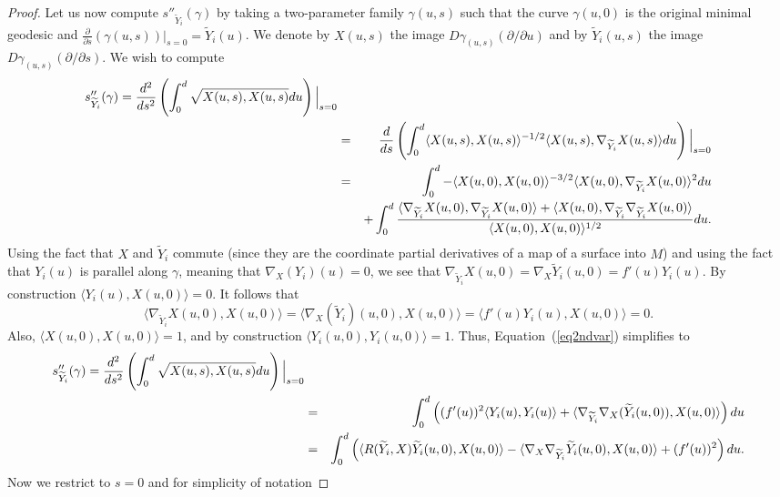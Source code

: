 \begin{proof}
Let us now compute $s''_{\widetilde Y_i}(\gamma)$ by taking a
two-parameter family $\gamma(u,s)$ such that the curve $\gamma(u,0)$
is the original minimal geodesic and $\frac{\partial}{\partial
s}(\gamma(u,s))|_{s=0}=\widetilde Y_i(u)$.  We denote by $X(u,s)$
the image $D\gamma_{(u,s)}(\partial/\partial u)$ and by $\widetilde
Y_i(u,s)$ the image $D\gamma_{(u,s)}(\partial/\partial s)$. We wish
to compute
\begin{eqnarray}
s''_{\widetilde Y_i}(\gamma) =
\frac{d^2}{ds^2}\left(\int_0^d\sqrt{X(u,s),X(u,s)}du\right)\Bigl|_{s=0}\Bigr.
& &
 \nonumber \\
& = & \frac{d}{ds}\left(\int_0^d\langle X(u,s),X(u,s)\rangle^{-1/2}
\langle
X(u,s),\nabla_{\widetilde Y_i}X(u,s)\rangle du\right)\Bigl|_{s=0}\Bigr. \nonumber \\
& = &  \int_0^d-\langle X(u,0),X(u,0)\rangle^{-3/2}\langle
X(u,0),\nabla_{\widetilde
Y_i}X(u,0)\rangle^2du \label{eq2ndvar} \\
& &  +\int_0^d\frac{\langle \nabla_{\widetilde
Y_i}X(u,0),\nabla_{\widetilde Y_i}X(u,0)\rangle +\langle
X(u,0),\nabla_{\widetilde Y_i}\nabla_{\widetilde
Y_i}X(u,0)\rangle}{\langle X(u,0),X(u,0)\rangle^{1/2}}du \nonumber.
\end{eqnarray}
Using the fact that $X$ and $\widetilde Y_i$ commute (since they are
the coordinate partial derivatives of a map of a surface into $M$)
and using the fact that $Y_i(u)$ is parallel along $\gamma$, meaning
that $\nabla_X(Y_i)(u)=0$, we see that $\nabla_{\widetilde
Y_i}X(u,0)=\nabla_X\widetilde Y_i(u,0)=f'(u)Y_i(u)$. By construction
$\langle Y_i(u),X(u,0)\rangle=0$. It follows that
$$\langle \nabla_{\widetilde Y_i}X(u,0),X(u,0)\rangle=\langle \nabla_X(\widetilde
Y_i)(u,0),X(u,0)\rangle = \langle f'(u)Y_i(u),X(u,0)\rangle =0.$$
Also, $\langle X(u,0),X(u,0)\rangle=1$, and by construction $\langle
Y_i(u,0),Y_i(u,0)\rangle=1$. Thus, Equation~(\ref{eq2ndvar})
simplifies to
\begin{eqnarray}
s''_{\widetilde
Y_i}(\gamma)=\frac{d^2}{ds^2}\left(\int_0^d\sqrt{X(u,s),X(u,s)}du\right)\Bigl|_{s=0}\Bigr.
 \label{2ndvaria}
\\& = & \int_0^d\left((f'(u))^2\langle
Y_i(u),Y_i(u)\rangle+\langle \nabla_{\widetilde
Y_i}\nabla_X(\widetilde
Y_i(u,0)),X(u,0)\rangle\right)du \nonumber\\
& = & \int_0^d\left(\langle R(\widetilde Y_i,X)\widetilde
Y_i(u,0),X(u,0)\rangle-\langle \nabla_X\nabla_{\widetilde
Y_i}\widetilde Y_i(u,0),X(u,0)\rangle+(f'(u))^2\right)
du.\nonumber\end{eqnarray} Now we restrict to $s=0$ and for simplicity of notation

\end{proof}
